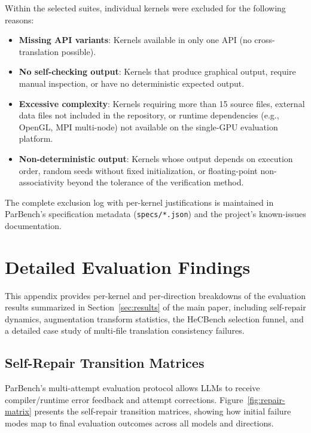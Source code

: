 Within the selected suites, individual kernels were excluded for the following
reasons:
\begin{itemize}
  \item \textbf{Missing API variants}: Kernels available in only one API (no
    cross-translation possible).
  \item \textbf{No self-checking output}: Kernels that produce graphical output,
    require manual inspection, or have no deterministic expected output.
  \item \textbf{Excessive complexity}: Kernels requiring more than 15 source
    files, external data files not included in the repository, or runtime
    dependencies (e.g., OpenGL, MPI multi-node) not available on the single-GPU
    evaluation platform.
  \item \textbf{Non-deterministic output}: Kernels whose output depends on
    execution order, random seeds without fixed initialization, or
    floating-point non-associativity beyond the tolerance of the verification
    method.
\end{itemize}

The complete exclusion log with per-kernel justifications is maintained in
ParBench's specification metadata (\texttt{specs/*.json}) and the project's
known-issues documentation.



\section{Detailed Evaluation Findings}
\label{sec:appendix-c}

This appendix provides per-kernel and per-direction breakdowns of the evaluation
results summarized in Section~\ref{sec:results} of the main paper, including self-repair
dynamics, augmentation transform statistics, the HeCBench selection funnel, and
a detailed case study of multi-file translation consistency failures.

\subsection{Self-Repair Transition Matrices}
\label{sec:appendix-c1}

ParBench's multi-attempt evaluation protocol allows LLMs to receive
compiler/runtime error feedback and attempt corrections. Figure~\ref{fig:repair-matrix}
presents the self-repair transition matrices, showing how initial failure modes
map to final evaluation outcomes across all models and directions.

